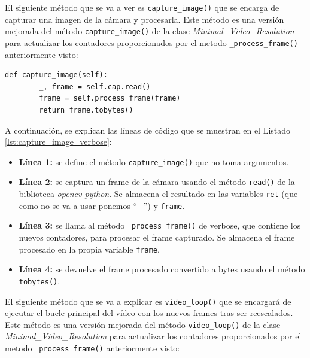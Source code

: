 El siguiente método que se va a ver es \texttt{capture\_image()} que se encarga de capturar una imagen de la cámara y procesarla. Este método es una versión mejorada del método \texttt{capture\_image()} de la clase \textit{Minimal\_Video\_Resolution} para actualizar los contadores proporcionados por el metodo \texttt{\_process\_frame()} anteriormente visto:
\begin{lstlisting}[style=pythonstyle, caption={Método \texttt{capture\_image()} de \textit{Minimal\_Video\_Resolution\_verbose}.}, label={lst:capture_image_verbose}]
def capture_image(self):
        _, frame = self.cap.read()
        frame = self.process_frame(frame)
        return frame.tobytes()
\end{lstlisting}
\vspace{\baselineskip}

A continuación, se explican las líneas de código que se muestran en el Listado \ref{lst:capture_image_verbose}:
\begin{itemize}
    \item \textbf{Línea 1:} se define el método \texttt{capture\_image()} que no toma argumentos.
    \item \textbf{Línea 2:} se captura un frame de la cámara usando el método \texttt{read()} de la biblioteca \textit{opencv-python}. Se almacena el resultado en las variables \texttt{ret} (que como no se va a usar ponemos ``\_'') y \texttt{frame}.
    \item \textbf{Línea 3:} se llama al método \texttt{\_process\_frame()} de verbose, que contiene los nuevos contadores, para procesar el frame capturado. Se almacena el frame procesado en la propia variable \texttt{frame}.
    \item \textbf{Línea 4:} se devuelve el frame procesado convertido a bytes usando el método \texttt{tobytes()}.
\end{itemize}
\vspace{\baselineskip}

El siguiente método que se va a explicar es \texttt{video\_loop()} que se encargará de ejecutar el bucle principal del vídeo con los nuevos frames tras ser reescalados. Este método es una versión mejorada del método \texttt{video\_loop()} de la clase \textit{Minimal\_Video\_Resolution} para actualizar los contadores proporcionados por el metodo \texttt{\_process\_frame()} anteriormente visto:

